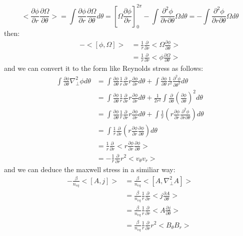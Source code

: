 \documentclass[11pt,a4paper]{article}
\begin{document}
	\begin{equation}
		<\frac{\partial\phi}{\partial{r}}\frac{\partial\Omega}{\partial\theta}>
		=\int\frac{\partial\phi}{\partial{r}}\frac{\partial\Omega}{\partial\theta}d\theta
		=[\Omega\frac{\partial\phi}{\partial{r}}]_0^{2\pi}-\int\frac{\partial^2\phi}{\partial{r}\partial\theta}\Omega{d\theta}
		=-\int\frac{\partial^2\phi}{\partial{r}\partial\theta}\Omega{d\theta}
	\end{equation}
	then:
	\begin{equation}
	\begin{aligned}
		-<[\phi,\Omega]>
		&=\frac{1}{r}\frac{\partial}{\partial{r}}<\Omega\frac{\partial\phi}{\partial\theta}>	\\
		&=\frac{1}{r}\frac{\partial}{\partial{r}}<\phi\frac{\partial\Omega}{\partial\theta}>
	\end{aligned}
	\end{equation}
	and we can convert it to the form like Reynolds stress as follows:
	\begin{equation}
	\begin{aligned}
		\int \frac{\partial\phi}{\partial\theta}\nabla_\perp^2\phi{d\theta}
		&=\int \frac{\partial\phi}{\partial\theta}\frac{1}{r}\frac{\partial}{\partial{r}}r\frac{\partial\phi}{\partial{r}}d\theta+\int \frac{\partial\phi}{\partial\theta}\frac{1}{r^2}\frac{\partial^2\phi}{\partial\theta^2}d\theta	\\
		&=\int \frac{\partial\phi}{\partial\theta}\frac{1}{r}\frac{\partial}{\partial{r}}r\frac{\partial\phi}{\partial{r}}d\theta+\frac{1}{2r^2}\int \frac{\partial}{\partial\theta}(\frac{\partial\phi}{\partial\theta})^2d\theta	\\
		&=\int \frac{\partial\phi}{\partial\theta}\frac{1}{r}\frac{\partial}{\partial{r}}r\frac{\partial\phi}{\partial{r}}d\theta+ \int \frac{1}{r}(r\frac{\partial\phi}{\partial{r}}\frac{\partial^2\phi}{\partial{r}\partial\theta})d\theta	\\
		&=\int \frac{1}{r}\frac{\partial}{\partial{r}}(r\frac{\partial\phi}{\partial{r}}\frac{\partial\phi}{\partial\theta})d\theta	\\
		&=\frac{1}{r}\frac{\partial}{\partial{r}}<r\frac{\partial\phi}{\partial{r}}\frac{\partial\phi}{\partial\theta}>	\\
		&=-\frac{1}{r}\frac{\partial}{\partial{r}}r^2<v_\theta{v_r}>
	\end{aligned}
	\end{equation} 
	and we can deduce the maxwell stress in a similiar way:
	\begin{equation}
	\begin{aligned}
		-\frac{\beta}{n_{eq}}<[A,j]>
		&=\frac{\beta}{n_{eq}}<[A,\nabla_\perp^2{A}]>	\\
		&=\frac{\beta}{n_{eq}}\frac{1}{r}\frac{\partial}{\partial{r}}<j\frac{\partial{A}}{\partial\theta}>	\\
		&=\frac{\beta}{n_{eq}}\frac{1}{r}\frac{\partial}{\partial{r}}<A\frac{\partial{j}}{\partial\theta}>	\\
		&=\frac{\beta}{n_{eq}}\frac{1}{r}\frac{\partial}{\partial{r}}r^2<B_\theta{B_r}>
	\end{aligned}
	\end{equation}
\end{document}

